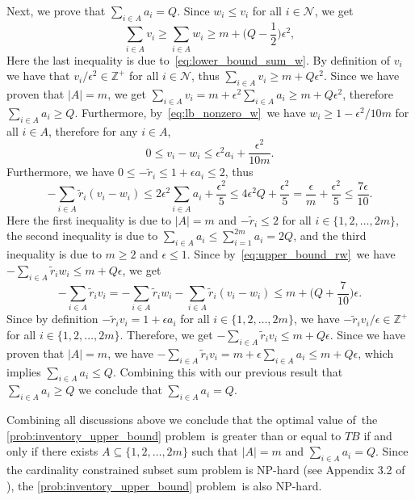 \documentclass[mnsc,non-blindrev]{informs3}
\theoremstyle{definition}
\begin{document}
\begin{appendices}{\Large{}}
Next, we prove that $\sum_{i\in A}a_i=Q$. Since $w_i\leq v_i$ for all $i\in\mathcal{N}$, we get
\begin{equation*}
\sum_{i\in A}v_i\geq \sum_{i\in A}w_i\geq m+\Big(Q-\dfrac{1}{2}\Big)\epsilon^2,
\end{equation*}
Here the last inequality is due to~\eqref{eq:lower_bound_sum_w}. By definition of $v_i$ we have that $v_i/\epsilon^2\in\mathbb{Z}^+$ for all $i\in\mathcal{N}$, thus $\sum_{i\in A}v_i\geq m+Q\epsilon^2$. Since we have proven that $|A|=m$, we get $\sum_{i\in A}v_i=m+\epsilon^2\sum_{i\in A}a_i\geq m+Q\epsilon^2$, therefore $\sum_{i\in A}a_i\geq Q$. Furthermore, by~\eqref{eq:lb_nonzero_w}~we have $w_i\geq 1-\epsilon^2/10m$ for all $i\in A$, therefore for any $i\in A$,
\begin{equation*}
0\leq v_i-w_i\leq \epsilon^2a_i+\dfrac{\epsilon^2}{10m}.
\end{equation*}
Furthermore, we have $0\leq-\tilde{r}_i\leq 1+\epsilon a_i\leq 2$, thus
\begin{equation*}
-\sum_{i\in A}\tilde{r}_i(v_i-w_i)\leq 2\epsilon^2\sum_{i\in A}a_i+\dfrac{\epsilon^2}{5}\leq 4\epsilon^2Q+\dfrac{\epsilon^2}{5}=\dfrac{\epsilon}{m}+\dfrac{\epsilon^2}{5}\leq \dfrac{7\epsilon}{10}.
\end{equation*}
Here the first inequality is due to $|A|=m$ and $-\tilde{r}_i\leq 2$ for all $i\in\{1,2,\dots,2m\}$, the second inequality is due to $\sum_{i\in A}a_i\leq \sum_{i=1}^{2m} a_i=2Q$, and the third inequality is due to $m\geq 2$ and $\epsilon\leq 1$. Since by~\eqref{eq:upper_bound_rw}~we have $-\sum_{i\in A}\tilde{r}_iw_i\leq m+Q\epsilon$, we get
\begin{equation*}
-\sum_{i\in A}\tilde{r}_iv_i=-\sum_{i\in A}\tilde{r}_iw_i-\sum_{i\in A}\tilde{r}_i(v_i-w_i)\leq m+\Big(Q+\dfrac{7}{10}\Big)\epsilon.
\end{equation*}
Since by definition $-\tilde{r}_iv_i=1+\epsilon a_i$ for all \mbox{$i\in\{1,2,\dots,2m\}$}, we have $-\tilde{r}_iv_i/\epsilon\in\mathbb{Z}^+$ for all \mbox{$i\in\{1,2,\dots,2m\}$}. Therefore, we get
$-\sum_{i\in A}\tilde{r}_iv_i\leq m+Q\epsilon$.
Since we have proven that $|A|=m$, we have $-\sum_{i\in A}\tilde{r}_iv_i=m+\epsilon\sum_{i\in A}a_i\leq m+Q\epsilon$, which implies $\sum_{i\in A}a_i\leq Q$. Combining this with our previous result that $\sum_{i\in A}a_i\geq Q$ we conclude that $\sum_{i\in A}a_i=Q$. 

Combining all discussions above we conclude that the optimal value of~the \ref{prob:inventory_upper_bound} problem~is greater than or equal to $TB$ if and only if there exists $A\subseteq\{1,2,\dots,2m\}$ such that $|A|=m$ and $\sum_{i\in A}a_i=Q$. Since the cardinality constrained subset sum problem is NP-hard (see Appendix 3.2 of \citealt{garey1979computers}), the \ref{prob:inventory_upper_bound} problem~is also NP-hard.


\end{appendices}
\end{document}
